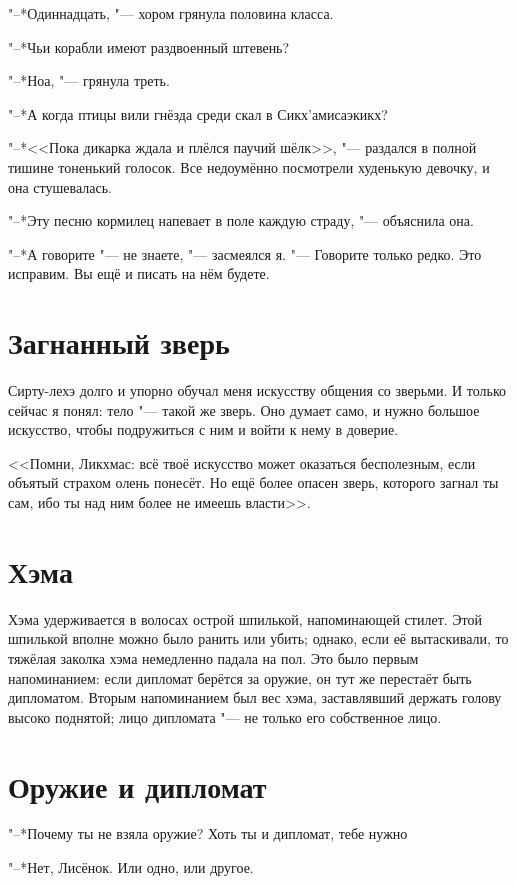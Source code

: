 \documentclass[a4paper,10pt,fleqn]{book}
\newcommand{\ldotst}{\so{...}\xspace}
\begin{document}
"--*Одиннадцать, "--- хором грянула половина класса.

"--*Чьи корабли имеют раздвоенный штевень?

"--*Ноа, "--- грянула треть.

"--*А когда птицы вили гнёзда среди скал в Сикх'амисаэкикх?

"--*<<Пока дикарка ждала и плёлся паучий шёлк>>, "--- раздался в полной тишине тоненький голосок.
Все недоумённо посмотрели худенькую девочку, и она стушевалась.

"--*Эту песню кормилец напевает в поле каждую страду, "--- объяснила она.

"--*А говорите "--- не знаете, "--- засмеялся я.
"--- Говорите только редко.
Это исправим.
Вы ещё и писать на нём будете.

\section{Загнанный зверь}

Сирту-лехэ долго и упорно обучал меня искусству общения со зверьми.
И только сейчас я понял: тело "--- такой же зверь.
Оно думает само, и нужно большое искусство, чтобы подружиться с ним и войти к нему в доверие.

<<Помни, Ликхмас: всё твоё искусство может оказаться бесполезным, если объятый страхом олень понесёт.
Но ещё более опасен зверь, которого загнал ты сам, ибо ты над ним более не имеешь власти>>.

\section{Хэма}

Хэма удерживается в волосах острой шпилькой, напоминающей стилет.
Этой шпилькой вполне можно было ранить или убить;
однако, если её вытаскивали, то тяжёлая заколка хэма немедленно падала на пол.
Это было первым напоминанием: если дипломат берётся за оружие, он тут же перестаёт быть дипломатом.
Вторым напоминанием был вес хэма, заставлявший держать голову высоко поднятой;
лицо дипломата "--- не только его собственное лицо.

\section{Оружие и дипломат}

"--*Почему ты не взяла оружие?
Хоть ты и дипломат, тебе нужно\ldotst

"--*Нет, Лисёнок.
Или одно, или другое.
\end{document}
